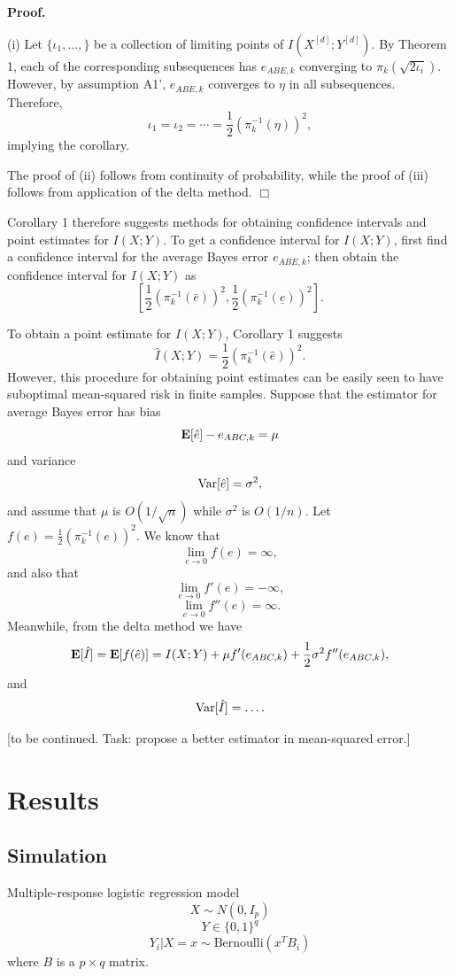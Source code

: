 \documentclass[12pt]{article}
\begin{document}
\textbf{Proof.} 

(i) Let $\{\iota_1,\hdots, \}$ be a collection of limiting points of $I(X^{[d]}; Y^{[d]})$.
By Theorem 1, each of the corresponding subsequences has $e_{ABE, k}$ converging to
$\pi_k(\sqrt{2 \iota_i})$.  However, by assumption A1', $e_{ABE, k}$ converges to $\eta$ in
all subsequences.  Therefore, 
\[\iota_1 = \iota_2 = \cdots = \frac{1}{2}(\pi_k^{-1}(\eta))^2,\]
implying the corollary.

The proof of (ii) follows from continuity of probability, while the proof of (iii) follows from application of the delta method.  $\Box$

Corollary 1 therefore suggests methods for obtaining confidence intervals and point estimates for $I(X; Y)$.
To get a confidence interval for $I(X; Y)$, first find a confidence interval for the average Bayes error $e_{ABE, k}$; then obtain the confidence interval for $I(X; Y)$ as
\[
[\frac{1}{2}(\pi_k^{-1}(\bar{e}))^2, \frac{1}{2}(\pi_k^{-1}(\underline{e}))^2].
\]


To obtain a point estimate for $I(X; Y)$, Corollary 1 suggests
\[\hat{I}(X; Y) = \frac{1}{2}(\pi_k^{-1}(\hat{e}))^2.\]
However, this procedure for obtaining point estimates can be easily seen to have suboptimal mean-squared risk in finite samples.
Suppose that the estimator for average Bayes error has bias
\[
\textbf{E}[\hat{e}] - e_{ABC, k} = \mu
\]
and variance
\[
\text{Var}[\hat{e}] = \sigma^2,
\]
and assume that $\mu$ is $O(1/\sqrt{n})$ while $\sigma^2$ is $O(1/n)$.
Let $f(e) = \frac{1}{2}(\pi_k^{-1}(e))^2$.
We know that
\[
\lim_{e \to 0} f(e) = \infty,
\]
and also that
\[
\lim_{e \to 0} f'(e) = -\infty,
\]
\[
\lim_{e \to 0} f''(e) = \infty.
\]
Meanwhile, from the delta method we have
\[
\textbf{E}[\hat{I}] = \textbf{E}[f(\hat{e})] = I(X; Y) + \mu f'(e_{ABC, k}) + \frac{1}{2} \sigma^2 f''(e_{ABC, k}),
\]
and
\[
\text{Var}[\hat{I}] = \hdots.
\]

[to be continued.  Task: propose a better estimator in mean-squared error.]

\section{Results}

\subsection{Simulation}

Multiple-response logistic regression model
\[
X \sim N(0, I_p)
\]
\[
Y \in \{0,1\}^q
\]
\[
Y_i|X = x \sim \text{Bernoulli}(x^T B_i)
\]
where $B$ is a $p \times q$ matrix.
\end{document}
